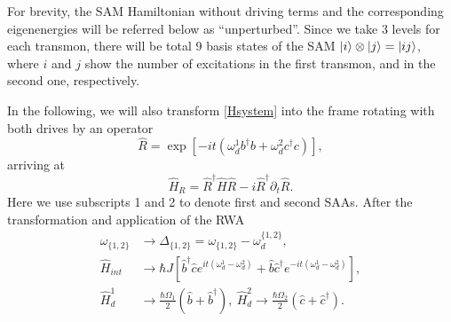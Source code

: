 \documentclass[%
 aps, prx,
 amsmath,amssymb,
 reprint,%
superscriptaddress
]{revtex4-2}
\begin{document}
For brevity, the SAM Hamiltonian without driving 
terms and the corresponding eigenenergies will be 
referred below as ``unperturbed''. Since we take 
3 levels for each transmon, there will be total 9 
basis states of the SAM $\ket{i}\otimes \ket{j} = 
\ket{ij}$, where $i$ and $j$ show the number of 
excitations in the first transmon, and in the 
second one, respectively.


In the following, we will also transform 
\autoref{Hsystem} into the frame rotating with 
both drives by an operator
\begin{equation}
\hat R = \exp[-i t (\omega_d^1 
b^{\dagger}b+\omega_d^2 
c^{\dagger}c)],\label{eq:R}
\end{equation}
arriving at
\begin{equation}
\hat H_R = \hat R^{\dagger}\hat H \hat R -	 
{i}\hat R^{\dagger}\partial_t \hat 
R.\label{eq:rotation}
\end{equation}
Here we use subscripts 1 and 2 to denote first and second SAAs. After the transformation and application of the RWA
\begin{equation}
\begin{aligned}
	\omega_{\{1,2\}} &\rightarrow \Delta_{\{1,2\}} = \omega_{\{1,2\}} - \omega_d^{\{1,2\}},\\
	\hat H_{int} &\rightarrow \hbar J \left[\hat 
	b^\dag \hat c e^{it(\omega_d^1 - \omega_d^2)} 
	+ \hat b \hat c^\dag e^{-it(\omega_d^1 - 
	\omega_d^2)}\right],\\
	\hat H_{d}^1 &\rightarrow \frac{\hbar \Omega_1}{2}(\hat b  + \hat b^\dag),\ 	\hat H_{d}^2 \rightarrow \frac{\hbar \Omega_2}{2}(\hat c  + \hat c^\dag).
\end{aligned}
\label{eq:RWA}
\end{equation}
\end{document}
